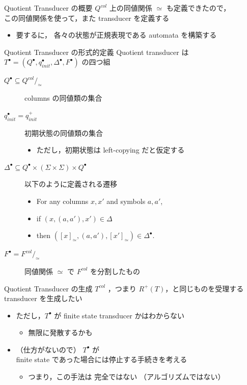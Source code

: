 \documentclass[presentation, xetex]{beamer}
\begin{document}
\begin{frame}[label={sec:org06b5ccb}]{Quotient Transducer の概要}
\(Q^{col}\) 上の同値関係 \(\simeq\) も定義できたので，\\
この同値関係を使って，また transducer を定義する
\begin{itemize}
\item 要するに， \alert{\alert{各々の状態が正規表現である automata}} を構築する
\end{itemize}
\end{frame}


\begin{frame}[label={sec:org2d5538e}]{Quotient Transducer の形式的定義}
\alert{\alert{Quotient transducer}} は \(T^\bullet = (Q^\bullet, q_{init}^\bullet, \Delta^\bullet, F^\bullet)\) の四つ組
\begin{description}
\item[{\(Q^\bullet \subseteq Q^{col}/_{\simeq}\)}] columns の同値類の集合
\item[{\(q_{init}^\bullet = q_{init}^+\)}] 初期状態の同値類の集合
\begin{itemize}
\item ただし，初期状態は left-copying だと仮定する
\end{itemize}
\item[{\(\Delta^\bullet \subseteq Q^\bullet \times (\Sigma \times \Sigma) \times Q^\bullet\)}] 以下のように定義される遷移
\begin{itemize}
\item For any columns \(x,x'\) and symbols \(a,a'\),
\item if \((x,(a,a'),x') \in \Delta\)
\item then \(([x]_\simeq, (a, a'), [x']_\simeq) \in \Delta^\bullet\).
\end{itemize}
\item[{\(F^\bullet = F^{col}/_\simeq\)}] 同値関係 \(\simeq\) で \(F^{col}\) を分割したもの
\end{description}
\end{frame}



\begin{frame}[label={sec:org6a99d21}]{Quotient Transducer の生成}
\(T^{col}\) ，つまり \(R^+(T)\)，と同じものを受理する transducer を生成したい
\begin{itemize}
\item ただし，\(T^\bullet\) が \alert{\alert{finite state transducer かはわからない}}
\begin{itemize}
\item 無限に発散するかも
\end{itemize}
\item （仕方がないので） \(T^\bullet\) が \\
finite state であった場合には停止する手続きを考える
\begin{itemize}
\item つまり，この手法は \alert{\alert{完全ではない}} （アルゴリズムではない）
\end{itemize}
\end{itemize}
\end{frame}
\end{document}
